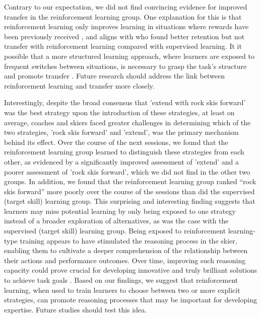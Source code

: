 \documentclass[pdflatex,sn-mathphys-num]{sn-jnl}%
\theoremstyle{thmstyleone}%
\theoremstyle{thmstyletwo}%
\theoremstyle{thmstylethree}%
\begin{document}

Contrary to our expectation, we did not find convincing evidence for improved transfer in the reinforcement learning group. One explanation for this is that reinforcement learning only improves learning in situations where rewards have been previously received \cite{robertson_memory_2018}, and aligns with \cite{hasson_reinforcement_2015} who found better retention but not transfer with reinforcement learning compared with supervised learning. It it possible that a more structured learning approach, where learners are exposed to frequent switches between situations, is necessary to grasp the task's structure and promote transfer \cite{braun_structure_2010}. Future research should address the link between reinforcement learning and transfer more closely. 

Interestingly, despite the broad consensus that 'extend with rock skis forward' was the best strategy upon the introduction of these strategies, at least on average, coaches and skiers faced greater challenges in determining which of the two strategies, 'rock skis forward' and 'extend', was the primary mechanism behind its effect. Over the course of the next sessions, we found that the reinforcement learning group learned to distinguish these strategies from each other, as evidenced by a significantly improved assessment of 'extend' and a poorer assessment of 'rock skis forward', which we did not find in the other two groups. In addition, we found that the reinforcement learning group ranked “rock skis forward” more poorly over the course of the sessions than did the supervised (target skill) learning group. This surprising and interesting finding suggests that learners may miss potential learning by only being exposed to one strategy instead of a broader exploration of alternatives, as was the case with the supervised (target skill) learning group. Being exposed to reinforcement learning-type training appears to have stimulated the reasoning process in the skier, enabling them to cultivate a deeper comprehension of the relationship between their actions and performance outcomes\cite{tsay_strategic_2023}. Over time, improving such reasoning capacity could prove crucial for developing innovative and truly brilliant solutions to achieve task goals  \cite{ericsson_scientific_1998}. Based on our findings, we suggest that reinforcement learning, when used to train learners to choose between two or more explicit strategies, can promote reasoning processes that may be important for developing expertise. Future studies should test this idea.
\end{document}
